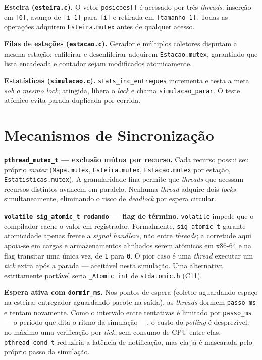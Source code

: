 \documentclass[12pt]{article}
\begin{document}
\textbf{Esteira (\texttt{esteira.c}).}
O vetor \texttt{posicoes[]} é acessado por três \textit{threads}: inserção em
\texttt{[0]}, avanço de \texttt{[i-1]} para \texttt{[i]} e retirada em
\texttt{[tamanho-1]}.  Todas as operações adquirem \texttt{Esteira.mutex}
antes de qualquer acesso.

\textbf{Filas de estações (\texttt{estacao.c}).}
Gerador e múltiplos coletores disputam a mesma estação: enfileirar e
desenfileirar adquirem \texttt{Estacao.mutex}, garantindo que lista encadeada
e contador sejam modificados atomicamente.

\textbf{Estatísticas (\texttt{simulacao.c}).}
\texttt{stats\_inc\_entregues} incrementa e testa a meta \emph{sob o mesmo
lock}; atingida, libera o \textit{lock} e chama \texttt{simulacao\_parar}. O
teste atômico evita parada duplicada por corrida.

\section{Mecanismos de Sincronização}
\label{sec:sync}

\textbf{\texttt{pthread\_mutex\_t} --- exclusão mútua por recurso.}
Cada recurso possui seu próprio \textit{mutex} (\texttt{Mapa.mutex},
\texttt{Esteira.mutex}, \texttt{Estacao.mutex} por estação,
\texttt{Estatisticas.mutex}).  A granularidade fina permite que \textit{threads}
que acessam recursos distintos avancem em paralelo.  Nenhuma \textit{thread}
adquire dois \textit{locks} simultaneamente, eliminando o risco de \textit{deadlock}
por espera circular.

\textbf{\texttt{volatile sig\_atomic\_t rodando} --- flag de término.}
\texttt{volatile} impede que o compilador cache o valor em registrador.
Formalmente, \texttt{sig\_atomic\_t} garante atomicidade apenas frente a
\textit{signal handlers}, não entre \textit{threads}; a corretude aqui
apoia-se em cargas e armazenamentos alinhados serem atômicos em x86-64 e na
flag transitar uma única vez, de \texttt{1} para \texttt{0}.  O pior caso é
uma \textit{thread} executar um \textit{tick} extra após a parada ---
aceitável nesta simulação.  Uma alternativa estritamente portável seria
\texttt{\_Atomic int} de \texttt{stdatomic.h} (C11).

\textbf{Espera ativa com \texttt{dormir\_ms}.}
Nos pontos de espera (coletor aguardando espaço na esteira; entregador
aguardando pacote na saída), as \textit{threads} dormem \texttt{passo\_ms} e
tentam novamente.  Como o intervalo entre tentativas é limitado por
\texttt{passo\_ms} --- o período que dita o ritmo da simulação ---, o custo do
\textit{polling} é desprezível: no máximo uma verificação por \textit{tick},
sem consumo de CPU entre elas.  \texttt{pthread\_cond\_t} reduziria a latência
de notificação, mas ela já é mascarada pelo próprio passo da simulação.
\end{document}
